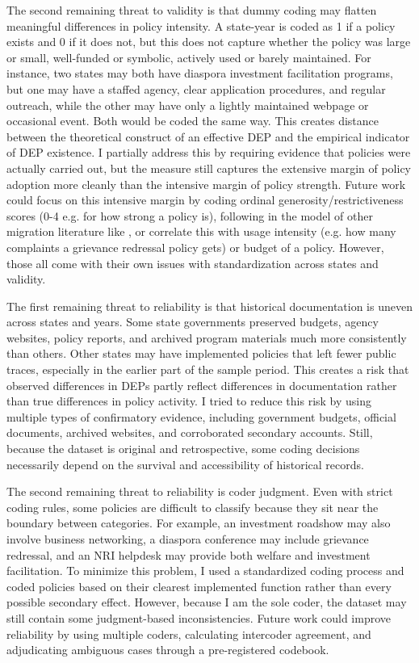 \documentclass[12pt]{article}
\begin{document}
The second remaining threat to validity is that dummy coding may flatten meaningful differences in policy intensity. A state-year is coded as 1 if a policy exists and 0 if it does not, but this does not capture whether the policy was large or small, well-funded or symbolic, actively used or barely maintained. For instance, two states may both have diaspora investment facilitation programs, but one may have a staffed agency, clear application procedures, and regular outreach, while the other may have only a lightly maintained webpage or occasional event. Both would be coded the same way. This creates distance between the theoretical construct of an effective DEP and the empirical indicator of DEP existence. I partially address this by requiring evidence that policies were actually carried out, but the measure still captures the extensive margin of policy adoption more cleanly than the intensive margin of policy strength. Future work could focus on this intensive margin by coding ordinal generosity/restrictiveness scores (0-4 e.g. for how strong a policy is), following in the model of other migration literature like \citet{scipioni_migration_2018}, or correlate this with usage intensity (e.g. how many complaints a grievance redressal policy gets) or budget of a policy. However, those all come with their own issues with standardization across states and validity.

The first remaining threat to reliability is that historical documentation is uneven across states and years. Some state governments preserved budgets, agency websites, policy reports, and archived program materials much more consistently than others. Other states may have implemented policies that left fewer public traces, especially in the earlier part of the sample period. This creates a risk that observed differences in DEPs partly reflect differences in documentation rather than true differences in policy activity. I tried to reduce this risk by using multiple types of confirmatory evidence, including government budgets, official documents, archived websites, and corroborated secondary accounts. Still, because the dataset is original and retrospective, some coding decisions necessarily depend on the survival and accessibility of historical records.

The second remaining threat to reliability is coder judgment. Even with strict coding rules, some policies are difficult to classify because they sit near the boundary between categories. For example, an investment roadshow may also involve business networking, a diaspora conference may include grievance redressal, and an NRI helpdesk may provide both welfare and investment facilitation. To minimize this problem, I used a standardized coding process and coded policies based on their clearest implemented function rather than every possible secondary effect. However, because I am the sole coder, the dataset may still contain some judgment-based inconsistencies. Future work could improve reliability by using multiple coders, calculating intercoder agreement, and adjudicating ambiguous cases through a pre-registered codebook.
\end{document}

